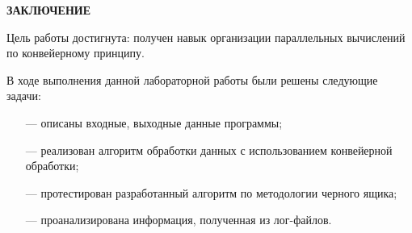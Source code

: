 \begin{center}
    \textbf{ЗАКЛЮЧЕНИЕ}
\end{center}

Цель работы достигнута: получен навык организации параллельных вычислений по конвейерному принципу.

\vspace{5mm}

В ходе выполнения данной лабораторной работы были решены следующие задачи:
\begin{itemize}
	\item[---] описаны входные, выходные данные программы;
	\item[---] реализован алгоритм обработки данных с использованием конвейерной обработки;
	\item[---] протестирован разработанный алгоритм по методологии черного ящика;
        \item[---] проанализирована информация, полученная из лог-файлов.
\end{itemize}